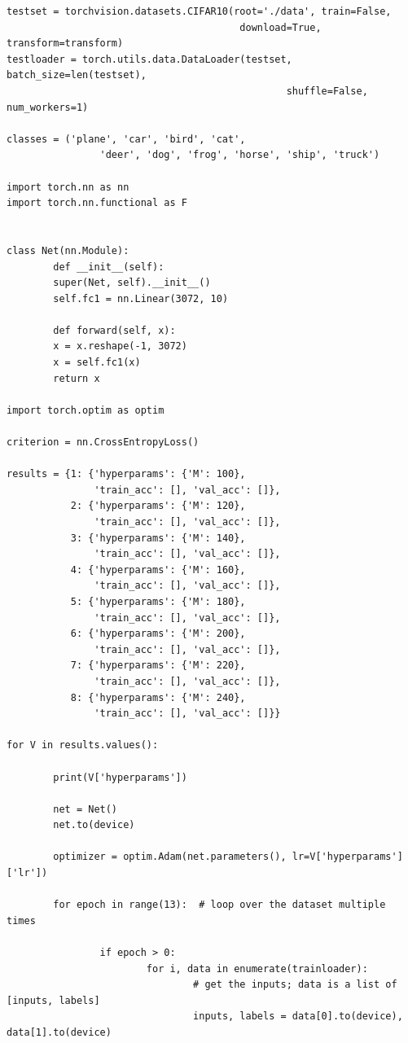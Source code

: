 \documentclass{article}
\begin{document}
\begin{enumerate}
\begin{verbatim}
testset = torchvision.datasets.CIFAR10(root='./data', train=False,
                                        download=True, transform=transform)
testloader = torch.utils.data.DataLoader(testset, batch_size=len(testset),
                                                shuffle=False, num_workers=1)

classes = ('plane', 'car', 'bird', 'cat',
                'deer', 'dog', 'frog', 'horse', 'ship', 'truck')

import torch.nn as nn
import torch.nn.functional as F


class Net(nn.Module):
        def __init__(self):
        super(Net, self).__init__()
        self.fc1 = nn.Linear(3072, 10)

        def forward(self, x):
        x = x.reshape(-1, 3072)
        x = self.fc1(x)
        return x

import torch.optim as optim

criterion = nn.CrossEntropyLoss()

results = {1: {'hyperparams': {'M': 100},
               'train_acc': [], 'val_acc': []},
           2: {'hyperparams': {'M': 120},
               'train_acc': [], 'val_acc': []},
           3: {'hyperparams': {'M': 140},
               'train_acc': [], 'val_acc': []},
           4: {'hyperparams': {'M': 160},
               'train_acc': [], 'val_acc': []},
           5: {'hyperparams': {'M': 180},
               'train_acc': [], 'val_acc': []},
           6: {'hyperparams': {'M': 200},
               'train_acc': [], 'val_acc': []},
           7: {'hyperparams': {'M': 220},
               'train_acc': [], 'val_acc': []},
           8: {'hyperparams': {'M': 240},
               'train_acc': [], 'val_acc': []}}

for V in results.values():

        print(V['hyperparams'])
        
        net = Net()
        net.to(device)
        
        optimizer = optim.Adam(net.parameters(), lr=V['hyperparams']['lr'])
        
        for epoch in range(13):  # loop over the dataset multiple times
        
                if epoch > 0:
                        for i, data in enumerate(trainloader):
                                # get the inputs; data is a list of [inputs, labels]
                                inputs, labels = data[0].to(device), data[1].to(device)
                                

\end{verbatim}
\end{enumerate}
\end{document}
